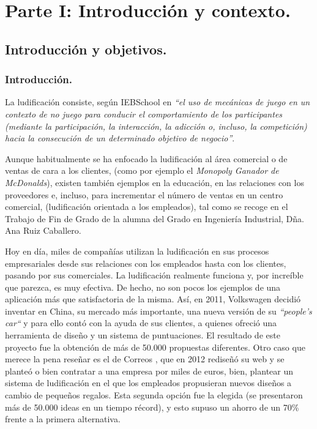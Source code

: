 \documentclass[twoside]{report}
\begin{document}
\tableofcontents

\listoffigures
 
\listoftables

\clearpage
{}
\chapter{Parte I: Introducción y contexto.}
\section{Introducción y objetivos.}

\subsection{Introducción.}

La ludificación consiste, según IEBSchool \cite{iebschoolGami} en \textit{“el uso de mecánicas de juego en un contexto de no juego para conducir el comportamiento de los participantes (mediante la participación, la interacción, la adicción o, incluso, la competición) hacia la consecución de un determinado objetivo de negocio”}. 

Aunque habitualmente se ha enfocado la ludificación al área comercial o de ventas de cara a los clientes, (como por ejemplo el \cite{monopolymcdo} \textit{Monopoly Ganador de McDonalds}), existen también ejemplos en la educación, en las relaciones con los proveedores e, incluso, para incrementar el número de ventas en un centro comercial, (ludificación orientada a los empleados), tal como se recoge en el Trabajo de Fin de Grado de la alumna del Grado en Ingeniería Industrial, \cite{anatfg} Dña. Ana Ruiz Caballero.

Hoy en día, miles de compañías utilizan la ludificación en sus procesos empresariales desde sus relaciones con los empleados hasta con los clientes, pasando por sus comerciales. La ludificación realmente funciona y, por increíble que parezca, es muy efectiva. De hecho, no son pocos los ejemplos de una aplicación más que satisfactoria de la misma. Así, en 2011, \cite{accentureGami} Volkswagen decidió inventar en China, su mercado más importante, una nueva versión de su \textit{“people’s car“} y para ello contó con la ayuda de sus clientes, a quienes ofreció una herramienta de diseño y un sistema de puntuaciones. El resultado de este proyecto fue la obtención de más de 50.000 propuestas diferentes. Otro caso que merece la pena reseñar es el de Correos \cite{confidencialcorreosgami}, que en 2012 rediseñó su web y se planteó o bien contratar a una empresa por miles de euros, bien, plantear un sistema de ludificación en el que los empleados propusieran nuevos diseños a cambio de pequeños regalos. Esta segunda opción fue la elegida (se presentaron más de 50.000 ideas en un tiempo récord), y esto supuso un ahorro de un 70\% frente a la primera alternativa. 
\end{document}
